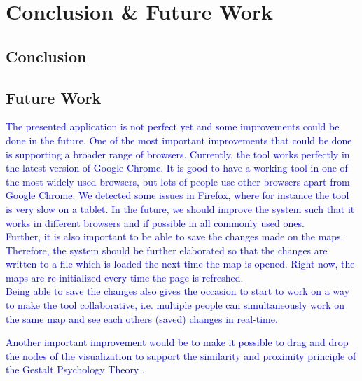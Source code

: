 \chapter{Conclusion \& Future Work}\label{ch:conclusion-future-work}

\section{Conclusion}\label{sec:conclusion}

\section{Future Work}\label{sec:future-work}

\textcolor{blue}{
The presented application is not perfect yet and some improvements could be done in the future. One of the most important improvements that could be done is supporting a broader range of browsers. Currently, the tool works perfectly in the latest version of Google Chrome. It is good to have a working tool in one of the most widely used browsers, but lots of people use other browsers apart from Google Chrome. We detected some issues in Firefox, where for instance the tool is very slow on a tablet. In the future, we should improve the system such that it works in different browsers and if possible in all commonly used ones.}\\

\textcolor{blue}{
Further, it is also important to be able to save the changes made on the maps. Therefore, the system should be further elaborated so that the changes are written to a file which is loaded the next time the map is opened. Right now, the maps are re-initialized every time the page is refreshed.}\\

\textcolor{blue}{
Being able to save the changes also gives the occasion to start to work on a way to make the tool collaborative, i.e. multiple people can simultaneously work on the same map and see each others (saved) changes in real-time.\\
}

\textcolor{blue}{
Another important improvement would be to make it possible to drag and drop the nodes of the visualization to support the similarity and proximity principle of the Gestalt Psychology Theory \citep{koffka2013principles}.\\
}
